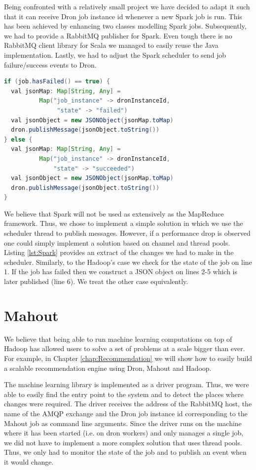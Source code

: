 \documentclass[11pt,a4paper,twoside]{report}
\begin{document}
Being confronted with a relatively small project we have decided to adapt it such that it can receive Dron job instance id whenever a new Spark job is run. This has been achieved by enhancing two classes modelling Spark jobs. Subsequently, we had to provide a RabbitMQ publisher for Spark. Even tough there is no RabbitMQ client library for Scala we managed to easily reuse the Java implementation. Lastly, we had to adjust the Spark scheduler to send job failure/success events to Dron.\\


\begin{lstlisting}[language=Java, caption={Additions to the Mesos scheduler:
whenever a job completes, a JSON object is constructed and published according to
the job's state.},label={lst:Spark}]
if (job.hasFailed() == true) {
  val jsonMap: Map[String, Any] =
          Map("job_instance" -> dronInstanceId,
               "state" -> "failed")
  val jsonObject = new JSONObject(jsonMap.toMap)
  dron.publishMessage(jsonObject.toString())       
} else {
  val jsonMap: Map[String, Any] =
          Map("job_instance" -> dronInstanceId,
              "state" -> "succeeded")
  val jsonObject = new JSONObject(jsonMap.toMap)
  dron.publishMessage(jsonObject.toString())       
}
\end{lstlisting}


We believe that Spark will not be used as extensively as the MapReduce framework. Thus, we chose to implement a simple solution in which we use the scheduler thread to publish messages. However, if a performance drop is observed one could simply implement a solution based on channel and thread pools. Listing \ref{lst:Spark} provides an extract of the changes we had to make in the scheduler. Similarly, to the Hadoop's case we check for the state of the job on line 1. If the job has failed then we construct a JSON object on lines 2-5 which is later published (line 6). We treat the other case equivalently.

\section{Mahout}
We believe that being able to run machine learning computations on top of Hadoop has allowed users to solve a set of problems at a scale bigger than ever. For example, in Chapter \ref{chap:Recommendation} we will show how to easily build a scalable recommendation engine using Dron, Mahout and Hadoop.


The machine learning library is implemented as a driver program. Thus, we were able to easily find the entry point to the system and to detect the places where changes were required. The driver receives the address of the RabbitMQ host, the name of the AMQP exchange and the Dron job instance id corresponding to the Mahout job as command line arguments. Since the driver runs on the machine where it has been started (i.e. on dron workers) and only manages a single job, we did not have to implement a more complex solution that uses thread pools. Thus, we only had to monitor the state of the job and to publish an event when it would change.
\end{document}

